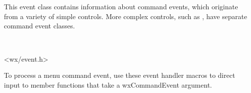 \section{}\label{wxcommandevent}

This event class contains information about command events, which originate from a variety of
simple controls. More complex controls, such as , have separate command event classes.


\\


<wx/event.h>




To process a menu command event, use these event handler macros to direct input to member
functions that take a wxCommandEvent argument.

